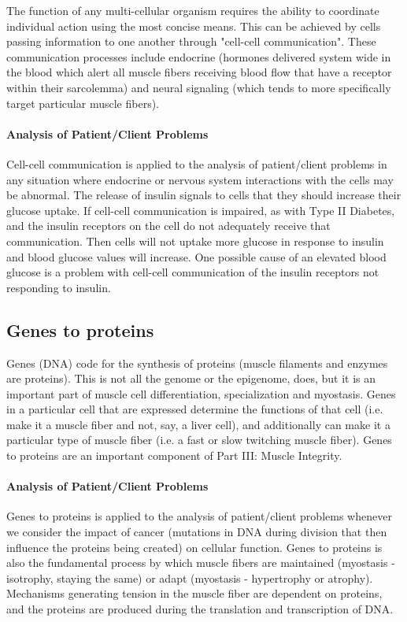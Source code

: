 The function of any multi-cellular organism requires the ability to coordinate individual action using the most concise means. This can be achieved by cells passing information to one another through "cell-cell communication". These communication processes include endocrine (hormones delivered system wide in the blood which alert all muscle fibers receiving blood flow that have a receptor within their sarcolemma) and neural signaling (which tends to more specifically target particular muscle fibers). 

\paragraph{Analysis of Patient/Client Problems}
Cell-cell communication is applied to the analysis of patient/client problems in any situation where endocrine or nervous system interactions with the cells may be abnormal. The release of insulin signals to cells that they should increase their glucose uptake. If cell-cell communication is impaired, as with Type II Diabetes, and the insulin receptors on the cell do not adequately receive that communication. Then cells will not uptake more glucose in response to insulin and blood glucose values will increase. One possible cause of an elevated blood glucose is a problem with cell-cell communication of the insulin receptors not responding to insulin. 

\subsection{Genes to proteins}
Genes (DNA) code for the synthesis of proteins (muscle filaments and enzymes are proteins). This is not all the genome\footnotemark{} or the epigenome\footnotemark{}, does, but it is an important part of muscle cell differentiation, specialization and myostasis. Genes in a particular cell that are expressed determine the functions of that cell (i.e. make it a muscle fiber and not, say, a liver cell), and additionally can make it a particular type of muscle fiber (i.e. a fast or slow twitching muscle fiber). Genes to proteins are an important component of Part III: Muscle Integrity.

\paragraph{Analysis of Patient/Client Problems}
Genes to proteins is applied to the analysis of patient/client problems whenever we consider the impact of cancer (mutations in DNA during division that then influence the proteins being created) on cellular function. Genes to proteins is also the fundamental process by which muscle fibers are maintained (myostasis - isotrophy, staying the same) or adapt (myostasis - hypertrophy or atrophy). Mechanisms generating tension in the muscle fiber are dependent on proteins, and the proteins are produced during the translation and transcription of DNA. 

